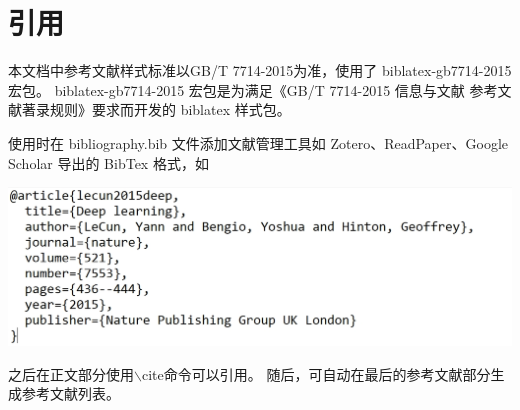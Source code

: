 \section{引用}
本文档中参考文献样式标准以GB/T 7714-2015为准，使用了 biblatex-gb7714-2015 宏包。
biblatex-gb7714-2015 宏包是为满足《GB/T 7714-2015 信息与文献 参考文献著录规则》要求而开发的 biblatex 样式包。

使用时在 bibliography.bib 文件添加文献管理工具如 Zotero、ReadPaper、Google Scholar 导出的 BibTex 格式，如

\includegraphics[width=0.5\linewidth]{figures/参考文献.png}

之后在正文部分使用{{{$\backslash$}cite}}命令可以引用\cite{lecun2015deep}。
随后，可自动在最后的参考文献部分生成参考文献列表。

